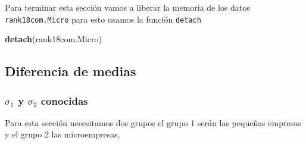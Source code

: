\documentclass[]{book}
\newenvironment{Shaded}{\begin{snugshade}}{\end{snugshade}}
\newcommand{\CommentTok}[1]{\textcolor[rgb]{0.56,0.35,0.01}{\textit{#1}}}
\newcommand{\DataTypeTok}[1]{\textcolor[rgb]{0.13,0.29,0.53}{#1}}
\newcommand{\FloatTok}[1]{\textcolor[rgb]{0.00,0.00,0.81}{#1}}
\newcommand{\KeywordTok}[1]{\textcolor[rgb]{0.13,0.29,0.53}{\textbf{#1}}}
\newcommand{\NormalTok}[1]{#1}
\newcommand{\OperatorTok}[1]{\textcolor[rgb]{0.81,0.36,0.00}{\textbf{#1}}}
\newcommand{\StringTok}[1]{\textcolor[rgb]{0.31,0.60,0.02}{#1}}
\begin{document}
\begin{Shaded}
\end{Shaded}

Para terminar esta sección vamos a liberar la memoria de los datos \texttt{rank18com.Micro} para esto usamos la función \texttt{detach}

\begin{Shaded}
\begin{Highlighting}[]
\KeywordTok{detach}\NormalTok{(rank18com.Micro)}
\end{Highlighting}
\end{Shaded}

\hypertarget{diferencia-de-medias}{%
\subsection{Diferencia de medias}\label{diferencia-de-medias}}

\hypertarget{sigma_1-y-sigma_2-conocidas}{%
\subsubsection{\texorpdfstring{\(\sigma_1\) y \(\sigma_2\) conocidas}{\textbackslash{}sigma\_1 y \textbackslash{}sigma\_2 conocidas}}\label{sigma_1-y-sigma_2-conocidas}}

Para esta sección necesitamos dos grupos el grupo 1 serán las pequeñas empresas y el grupo 2 las microempresas,

\begin{Shaded}
\end{Shaded}
\end{document}

